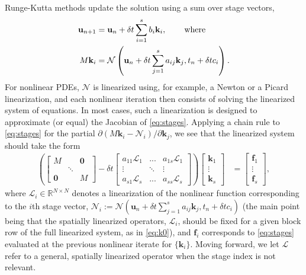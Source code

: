 \documentclass[review]{siamart}
\begin{document}
Runge-Kutta methods update the solution using a sum over stage vectors,
%
\begin{align}\label{eq:update}
\mathbf{u}_{n+1} & = \mathbf{u}_n + \delta t \sum_{i=1}^s b_i\mathbf{k}_i,
	\hspace{5ex}\textnormal{where}\\
M\mathbf{k}_i & = \mathcal{N}\left(\mathbf{u}_n + \delta t\sum_{j=1}^s a_{ij}\mathbf{k}_j, t_n+\delta tc_i\right).\label{eq:stages}
\end{align}
%
For nonlinear PDEs, $\mathcal{N}$ is linearized using, for example, a Newton or a
Picard linearization, and each nonlinear iteration then consists of solving the
linearized system of equations. In most cases, such a linearization
is designed to approximate (or equal) the Jacobian of \eqref{eq:stages}. Applying
a chain rule to \eqref{eq:stages} for the partial
$\partial(M\mathbf{k}_i-\mathcal{N}_i)/\partial\mathbf{k}_j$, we see that
the linearized system should take the form
%
\begin{align}\label{eq:k0}
\left( \begin{bmatrix} M  & & \mathbf{0} \\ & \ddots \\ \mathbf{0} & & M\end{bmatrix}
	- \delta t \begin{bmatrix} a_{11}\mathcal{L}_1 & ... & a_{1s}\mathcal{L}_1 \\
	\vdots & \ddots & \vdots \\ a_{s1}\mathcal{L}_s & ... & a_{ss} \mathcal{L}_s \end{bmatrix} \right)
	\begin{bmatrix} \mathbf{k}_1 \\ \vdots \\ \mathbf{k}_s \end{bmatrix}
& = \begin{bmatrix} \mathbf{f}_1 \\ \vdots \\ \mathbf{f}_s \end{bmatrix},
\end{align}
%
where $\mathcal{L}_i\in\mathbb{R}^{N\times N}$
denotes a linearization of the nonlinear function
corresponding to the $i$th stage vector, $\mathcal{N}_i:= \mathcal{N}\left(\mathbf{u}_n +
\delta t\sum_{j=1}^s a_{ij}\mathbf{k}_j, t_n+\delta tc_i\right)$ (the main
point being that the spatially linearized operators, $\mathcal{L}_i$, should
be fixed for a given block row of the full linearized system, as in \eqref{eq:k0}),
and $\mathbf{f}_i$ corresponds to \eqref{eq:stages} evaluated at
the previous nonlinear iterate for $\{\mathbf{k}_i\}$.
Moving forward, we let $\mathcal{L}$ refer to a general, spatially linearized
operator when the stage index is not relevant.
\end{document}

